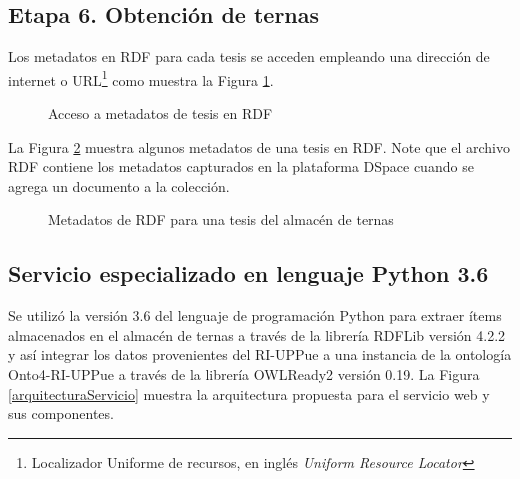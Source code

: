 \subsection{Etapa 6. Obtenci\'on de ternas}

Los metadatos en RDF para cada tesis se acceden empleando una direcci\'on de internet o URL\footnote{Localizador Uniforme de recursos, en ingl\'es \textit{Uniform Resource Locator}} como muestra la Figura \ref{accesoRdf}.\newline

\begin{figure}[!ht]
	\centering
    \caption{Acceso a metadatos de tesis en RDF}
    \label{accesoRdf}
\end{figure}

La Figura \ref{resultadoRdf} muestra algunos metadatos de una tesis en RDF. Note que el archivo RDF contiene los metadatos capturados en la plataforma DSpace cuando se agrega un documento a la colecci\'on.

\begin{figure}[!ht]
	\centering
    \caption{Metadatos de RDF para una tesis del almac\'en de ternas}
    \label{resultadoRdf}
\end{figure}

\subsection{Servicio especializado en lenguaje Python 3.6}

Se utiliz\'o la versi\'on 3.6 del lenguaje de programaci\'on Python para extraer \'items almacenados en el almac\'en de ternas a trav\'es de la librer\'ia RDFLib  versi\'on 4.2.2  \cite{RDFlib} y as\'i integrar los datos provenientes del RI-UPPue a una instancia de la ontolog\'ia Onto4-RI-UPPue a trav\'es de la librer\'ia OWLReady2 \cite{OWLReady2} versi\'on 0.19. La Figura \ref{arquitecturaServicio} muestra la arquitectura propuesta para el servicio web y sus componentes. 

